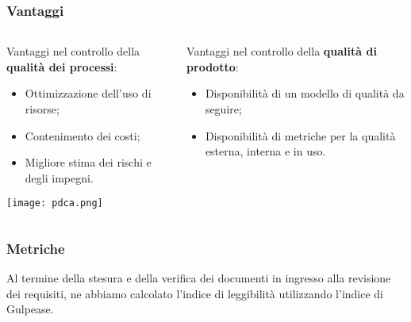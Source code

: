 \begin{frame}
  \frametitle{Vantaggi}
  \begin{columns}
    \begin{column}{0.4\textwidth}
Vantaggi nel controllo della \textbf{qualità dei processi}:
	\begin{itemize}
  	\item Ottimizzazione dell’uso di risorse;
  	\item Contenimento dei costi;
  	\item Migliore stima dei rischi e degli impegni.
	\end{itemize}
	\centering
	\texttt{[image: pdca.png]}
	\end{column}
	\begin{column}{0.4\textwidth}
	Vantaggi nel controllo della \textbf{qualità di prodotto}:
	\begin{itemize}
  	\item Disponibilità di un modello di qualità da seguire;
  	\item Disponibilità di metriche per la qualità esterna, interna e in uso.
	\end{itemize}
	\end{column}
   \end{columns}
\end{frame}

\begin{frame}
  \frametitle{Metriche}
  Al termine della stesura e della verifica dei documenti in ingresso alla revisione dei requisiti, ne abbiamo calcolato l'indice di leggibilità utilizzando l'indice di Gulpease.
\end{frame}

